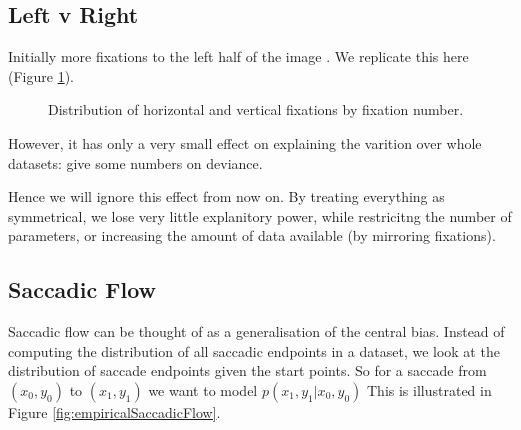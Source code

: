 \subsection{Left v Right}
\label{sec:LeftRight}

Initially more fixations to the left half of the image \citep{nuthmann-matthias2014}. We replicate this here (Figure \ref{fig:leftrightDist}).

\begin{figure}
\centering
{}
\caption{Distribution of horizontal and vertical fixations by fixation number.}
\label{fig:leftrightDist}
\end{figure}

However, it has only a very small effect on explaining the varition over whole datasets: give some numbers on deviance. 


Hence we will ignore this effect from now on. By treating everything as symmetrical, we lose very little explanitory power, while restricitng the number of parameters, or increasing the amount of data available (by mirroring fixations).

\subsection{Saccadic Flow}
\label{ModellingFlow}

Saccadic flow can be thought of as a generalisation of the central bias. Instead of computing the distribution of all saccadic endpoints in a dataset, we look at the distribution of saccade endpoints given the start points. So for a saccade from $(x_0, y_0)$ to $(x_1, y_1)$ we want to model $p(x_1,y_1|x_0, y_0)$ This is illustrated in Figure \ref{fig:empiricalSaccadicFlow}.

